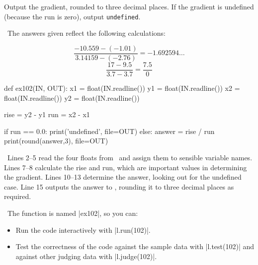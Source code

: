 Output the gradient, rounded to three decimal places.  If the gradient is undefined
(because the run is zero), output \texttt{undefined}.

\Sample

               {}
               {}

\Explanation\ The answers given reflect the following calculations:

\vspace{-5mm}
\minipagesthree{\[\frac{3.5-1}{10-5} = 0.5\]}
               {\[\frac{-10.559 - (-1.01)}{3.14159 - (-2.76)} = -1.692594\ldots\]}
               {\[\frac{17 - 9.5}{3.7 - 3.7} = \frac{7.5}{0}\]}


\Solution

\begin{pythoncode} 
  def ex102(IN, OUT):
    x1 = float(IN.readline())
    y1 = float(IN.readline())
    x2 = float(IN.readline())
    y2 = float(IN.readline())

    rise = y2 - y1
    run  = x2 - x1

    if run == 0.0:
      print('undefined', file=OUT)
    else:
      answer = rise / run
      print(round(answer,3), file=OUT)
\end{pythoncode}

\Explanation\ Lines 2--5 read the four floats from \IN\ and assign them to sensible
variable names. Lines 7--8 calculate the rise and run, which are important values in
determining the gradient. Lines 10--13 determine the answer, looking out for the undefined
case. Line 15 outputs the answer to \OUT, rounding it to three decimal places as required.

\Running\ The function is named \pycode|ex102|, so you can:
\begin{itemize}
  \item Run the code interactively with \pycode|l.run(102)|.
  \item Test the correctness of the code against the sample data with \pycode|l.test(102)|
    and against other judging data with \pycode|l.judge(102)|.
\end{itemize}
